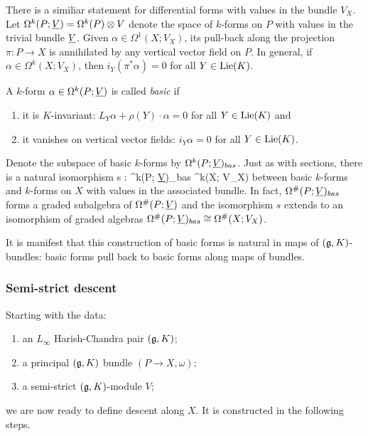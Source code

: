 \documentclass[10pt]{amsart}
\begin{document}
There is a similiar statement for differential forms with values in the bundle $V_X$. Let $\Omega^k(P ; \underline{V}) = \Omega^k(P) \otimes V$ denote the space of $k$-forms on $P$ with values in the trivial bundle $\underline{V}$. Given $\alpha \in \Omega^1(X ; V_X)$, its pull-back along the projection $\pi: P \to X$ is annihilated by any vertical vector field on $P$. In general, if $\alpha \in \Omega^k(X; V_X)$, then $i_Y(\pi^*\alpha) = 0$ for all $Y \in {\rm Lie}(K)$.

\begin{dfn} A $k$-form $\alpha \in \Omega^k(P; \underline{V})$ is called {\em basic} if 
\begin{enumerate}
\item it is $K$-invariant: $L_Y \alpha + \rho(Y) \cdot \alpha = 0 $ for all $Y \in {\rm Lie}(K)$ and
\item  it vanishes on vertical vector fields: $i_Y \alpha = 0$ for all $Y \in {\rm Lie}(K)$. 
\end{enumerate}
\end{dfn}

Denote the subspace of basic $k$-forms by $\Omega^k(P; \underline{V})_{bas}$. Just as with sections, there is a natural isomorphism
\ben
s : \Omega^k(P; \ul{V})_{bas} \xto{\cong} \Omega^k(X; V_X) 
\een
between basic $k$-forms and $k$-forms on $X$ with values in the associated bundle.
In fact, $\Omega^{\#}(P; \underline{V})_{bas}$ forms a graded subalgebra of $\Omega^{\#}(P; \underline{V})$ and the isomorphism $s$ extends to an isomorphism of graded algebras $\Omega^{\#}(P; \underline{V})_{bas} \cong \Omega^{\#}(X; V_X)$.

It is manifest that this construction of basic forms is natural in maps of $(\mathfrak g,K)$-bundles: basic forms pull back to basic forms along maps of bundles.

\subsubsection{Semi-strict descent}

Starting with the data:
\begin{enumerate}
\item an $L_\infty$ Harish-Chandra pair $(\mathfrak g,K)$;
\item a principal $(\mathfrak g,K)$ bundle $(P \to X, \omega)$;
\item a semi-strict $(\mathfrak g,K)$-module $V$;
\end{enumerate}
we are now ready to define descent along $X$. 
It is constructed in the following steps.
\end{document}
